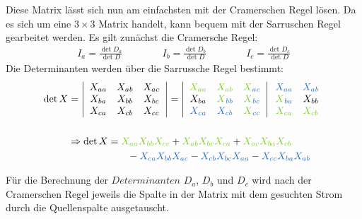 \documentclass[12pt,a4paper]{article}%
\numberwithin{equation}{section}
\def\colGreen#1{\begingroup\color{LimeGreen}{#1}\endgroup}
\def\colBlue#1{\begingroup\color{NavyBlue}{#1}\endgroup}
\begin{document}
  Diese Matrix lässt sich nun am einfachsten mit der Cramerschen Regel lösen. Da es sich um eine $3\times 3$ Matrix handelt, kann bequem mit der Sarruschen Regel gearbeitet werden.\newline
  Es gilt zunächst die Cramersche Regel:
  \begin{align}
    I_a = \frac{\det D_a}{\det D} \qquad \qquad I_b = \frac{\det D_b}{\det D} \qquad \qquad I_c = \frac{\det D_c}{\det D}
  \end{align}
  Die Determinanten werden über die Sarrussche Regel bestimmt:
  \begin{align}
    \det X &= \left|
      \begin{array}{c c c}
      X_{aa} & X_{ab} & X_{ac}\\
      X_{ba} & X_{bb} & X_{bc}\\
      X_{ca} & X_{cb} & X_{cc}\\
      \end{array}
    \right|    
    = \left|
      \begin{array}{c c c}
      \colGreen{X_{aa}} & \colGreen{X_{ab}} & \colGreen{X}_{\colBlue{ac}}\\
      X_{ba} & \colGreen{X}_{\colBlue{bb}} & \colGreen{X}_{\colBlue{bc}}\\
      \colBlue{X_{ca}} & \colBlue{X_{cb}} & \colGreen{X}_{\colBlue{cc}}\\
      \end{array}
    \right| 
    \begin{array}{c c}
      \colBlue{X_{aa}} & \colBlue{X_{ab}}\\
      \colGreen{X}_{\colBlue{ba}} & X_{bb}\\
      \colGreen{X_{ca}} & \colGreen{X_{cb}}\\
    \end{array} \nonumber \\
    \nonumber \\
    &\Rightarrow \det X =   \colGreen{X_{aa}} \colGreen{X_{bb}} \colGreen{X_{cc}} 
      + \colGreen{X_{ab}}   \colGreen{X_{bc}} \colGreen{X_{ca}}
      + \colGreen{X_{ac}}   \colGreen{X_{ba}} \colGreen{X_{cb}} \nonumber \\
      &\qquad \qquad \qquad- \colBlue{X_{ca}}    \colBlue{X_{bb}}  \colBlue{X_{ac}} 
      - \colBlue{X_{cb}}    \colBlue{X_{bc}}  \colBlue{X_{aa}}
      - \colBlue{X_{cc}}    \colBlue{X_{ba}}  \colBlue{X_{ab}}
  \end{align}
  
  Für die Berechnung der $Determinanten$ $D_a$, $D_b$ und $D_c$ wird nach der Cramerschen Regel jeweils die Spalte in der Matrix mit dem gesuchten Strom durch die Quellenspalte ausgetauscht.
  
\end{document}
